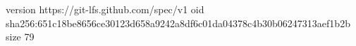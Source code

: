 version https://git-lfs.github.com/spec/v1
oid sha256:651c18be8656ce30123d658a9242a8df6c01da04378c4b30b06247313aef1b2b
size 79
